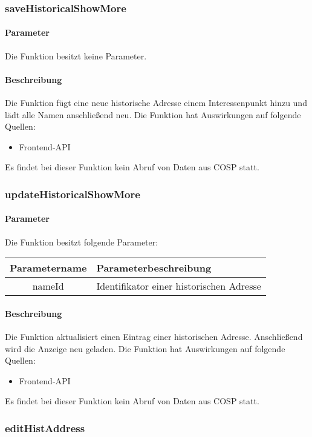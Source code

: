 \subsubsection{saveHistoricalShowMore}
\paragraph{Parameter} Die Funktion besitzt keine Parameter.
\paragraph{Beschreibung} Die Funktion fügt eine neue historische Adresse einem Interessenpunkt hinzu und lädt alle Namen anschließend neu. Die Funktion hat Auswirkungen auf folgende Quellen:
\begin{itemize}
	\item Frontend-API
\end{itemize}
Es findet bei dieser Funktion kein Abruf von Daten aus {\glqq COSP\grqq} statt.
\subsubsection{updateHistoricalShowMore}
\paragraph{Parameter} Die Funktion besitzt folgende Parameter:
\begin{table}[H]
	\begin{tabular}{|c|p{11cm}|}
		\hline
		\textbf{Parametername} & \textbf{Parameterbeschreibung} \\ \hline
		nameId & Identifikator einer historischen Adresse \\ \hline
	\end{tabular}
\end{table}
\paragraph{Beschreibung} Die Funktion aktualisiert einen Eintrag einer historischen Adresse. Anschließend wird die Anzeige neu geladen. Die Funktion hat Auswirkungen auf folgende Quellen:
\begin{itemize}
	\item Frontend-API
\end{itemize}
Es findet bei dieser Funktion kein Abruf von Daten aus {\glqq COSP\grqq} statt.
\subsubsection{editHistAddress}
